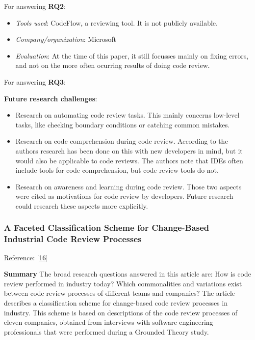 \documentclass[]{book}
\providecommand{\tightlist}{%
  \setlength{\itemsep}{0pt}\setlength{\parskip}{0pt}}
\begin{document}
For answering \textbf{RQ2}:

\begin{itemize}
\tightlist
\item
  \emph{Tools used}: CodeFlow, a reviewing tool. It is not publicly
  available.
\item
  \emph{Company/organization}: Microsoft
\item
  \emph{Evaluation}: At the time of this paper, it still focusses mainly
  on fixing errors, and not on the more often ocurring results of doing
  code review.
\end{itemize}

For answering \textbf{RQ3}:

\textbf{Future research challenges}:

\begin{itemize}
\tightlist
\item
  Research on automating code review tasks. This mainly concerns
  low-level tasks, like checking boundary conditions or catching common
  mistakes.
\item
  Research on code comprehension during code review. According to the
  authors research has been done on this with new developers in mind,
  but it would also be applicable to code reviews. The authors note that
  IDEs often include tools for code comprehension, but code review tools
  do not.
\item
  Research on awareness and learning during code review. Those two
  aspects were cited as motivations for code review by developers.
  Future research could research these aspects more explicitly.
\end{itemize}

\subsubsection{A Faceted Classification Scheme for Change-Based
Industrial Code Review
Processes}\label{a-faceted-classification-scheme-for-change-based-industrial-code-review-processes}

Reference: {[}\protect\hyperlink{ref-baum2016faceted}{16}{]}

\textbf{Summary} The broad research questions answered in this article
are: How is code review performed in industry today? Which commonalities
and variations exist between code review processes of different teams
and companies? The article describes a classification scheme for
change-based code review processes in industry. This scheme is based on
descriptions of the code review processes of eleven companies, obtained
from interviews with software engineering professionals that were
performed during a Grounded Theory study.
\end{document}
